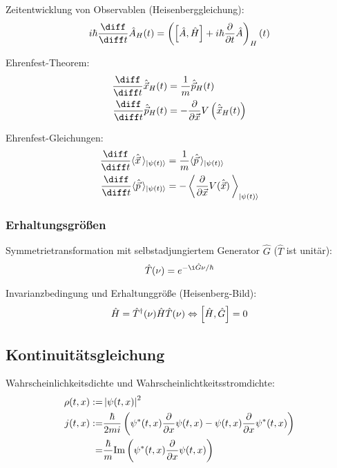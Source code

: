 \documentclass[11pt]{article}
\numberwithin{equation}{section}
\begin{document}
				\noindent
				Zeitentwicklung von Observablen (Heisenberggleichung):
				\begin{equation}
					i\hbar \tder{}{t} \hat{A}_H(t) = \left(\left[\hat{A}, \hat{H}\right] + i\hbar \pder{}{t} \hat{A}\right)_H (t)
				\end{equation}

				\noindent
				Ehrenfest-Theorem:
				\begin{equation}
					\begin{aligned}
						\tder{}{t} \hat{\vec{x}}_H(t) &= \frac{1}{m}\hat{\vec{p}}_H(t) \\
						\tder{}{t} \hat{\vec{p}}_H(t) &= - \pder{}{\vec{x}} V \left(\hat{\vec{x}}_H(t)\right) \\
					\end{aligned}
				\end{equation}

				\noindent
				Ehrenfest-Gleichungen:
				\begin{equation}
					\begin{aligned}
						\tder{}{t} \langle \hat{\vec{x}} \,\rangle_{\Ket{\psi(t)}} &= \frac{1}{m} \langle \hat{\vec{p}} \,\rangle_{\Ket{\psi(t)}} \\
						\tder{}{t} \langle \hat{\vec{p}} \,\rangle_{\Ket{\psi(t)}} &= - \left\langle \pder{}{\vec{x}} V(\hat{\vec{x}}) \,\right\rangle_{\Ket{\psi(t)}} \\
					\end{aligned}
				\end{equation}

			\subsubsection{Erhaltungsgrößen}
				\noindent
				Symmetrietransformation mit selbstadjungiertem Generator $\hat{G}$ ($\hat{T}$ ist unitär):
				\begin{equation}
					\hat{T}(\nu) = e^{-\i\hat{G}\nu/\hbar}
				\end{equation}

				\noindent
				Invarianzbedingung und Erhaltunggröße (Heisenberg-Bild):
				\begin{equation}
					\hat{H} =\hat{T}^\dagger(\nu)\hat{H} \hat{T}(\nu) \Leftrightarrow \left[\hat{H},\hat{G}\right] = 0
				\end{equation}

		\subsection{Kontinuitätsgleichung}
			\noindent
			Wahrscheinlichkeitsdichte und Wahrscheinlichtkeitsstromdichte:
			\begin{equation}
				\begin{aligned}
					\rho(t,x) :=& \left|\psi(t,x)\right|^2 \\
					j(t,x) :=& \frac{\hbar}{2mi}\left(
						\psi^*(t,x)\frac{\partial }{\partial x}\psi(t,x) - \psi(t,x)\frac{\partial }{\partial x}\psi^*(t,x)
					\right) \\
					=& \frac{\hbar}{m} \mathrm{Im}\left(
						\psi^*(t,x) \frac{\partial }{\partial x}\psi(t,x)
					\right)\\
				\end{aligned}
			\end{equation}
\end{document}
